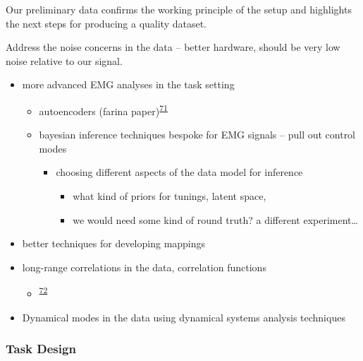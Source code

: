 \documentclass[
  a4paper,
]{article}
\providecommand{\tightlist}{%
  \setlength{\itemsep}{0pt}\setlength{\parskip}{0pt}}
\begin{document}
Our preliminary data confirms the working principle of the setup and
highlights the next steps for producing a quality dataset.

Address the noise concerns in the data -- better hardware, should be
very low noise relative to our signal.

\begin{itemize}
\item
  more advanced EMG analyses in the task setting

  \begin{itemize}
  \tightlist
  \item
    autoencoders (farina
    paper)\textsuperscript{\protect\hyperlink{ref-vujaklijaOnlineMappingEMG2018}{71}}
  \item
    bayesian inference techniques bespoke for EMG signals -- pull out
    control modes

    \begin{itemize}
    \tightlist
    \item
      choosing different aspects of the data model for inference

      \begin{itemize}
      \tightlist
      \item
        what kind of priors for tunings, latent space,
      \item
        we would need some kind of round truth? a different
        experiment\ldots{}
      \end{itemize}
    \end{itemize}
  \end{itemize}
\item
  better techniques for developing mappings
\item
  long-range correlations in the data, correlation functions

  \begin{itemize}
  \tightlist
  \item
    \textsuperscript{\protect\hyperlink{ref-crevecoeurGoldstandardApproachAddress2010}{72}}
  \end{itemize}
\item
  Dynamical modes in the data using dynamical systems analysis
  techniques
\end{itemize}

\hypertarget{task-design}{%
\subsubsection{Task Design}\label{task-design}}
\end{document}
